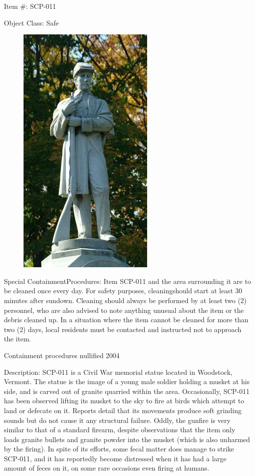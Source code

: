 
Item \#: SCP-011

Object Class: Safe

\begin{figure}
\includegraphics[scale=0.75]{scp/011.jpg}
\end{figure}

Special Containment\linebreak Procedures: Item SCP-011 and the area surrounding it are to be cleaned once every day. For safety purposes, cleaning\linebreak should start at least 30 minutes after sundown. Cleaning should always be performed by at least two (2) personnel, who are also advised to note anything unusual about the item or the debris cleaned up. In a situation where the item cannot be cleaned for more than two (2) days, local residents must be contacted and instructed not to approach the item.

\lb Containment procedures nullified 2004\rb

Description: SCP-011 is a Civil War memorial statue located in Woodstock, Vermont. The statue is the image of a young male soldier holding a musket at his side, and is carved out of granite quarried within the area. Occasionally, SCP-011 has been observed lifting its musket to the sky to fire at birds which attempt to land or defecate on it. Reports detail that its movements produce soft grinding sounds but do not cause it any structural failure. Oddly, the gunfire is very similar to that of a standard firearm, despite observations that the item only loads granite bullets and granite powder into the musket (which is also unharmed by the firing). In spite of its efforts, some fecal matter does manage to strike SCP-011, and it has reportedly become distressed when it has had a large amount of feces on it, on some rare occasions even firing at humans.

